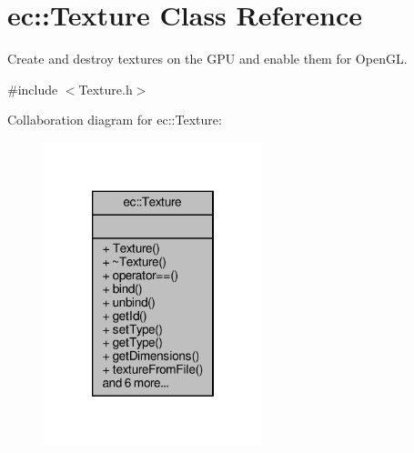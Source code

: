 \hypertarget{classec_1_1_texture}{}\section{ec\+:\+:Texture Class Reference}
\label{classec_1_1_texture}


Create and destroy textures on the G\+PU and enable them for Open\+GL.  




{\ttfamily \#include $<$Texture.\+h$>$}



Collaboration diagram for ec\+:\+:Texture\+:\nopagebreak
\begin{figure}[H]
\begin{center}
\leavevmode
\includegraphics[width=180pt]{classec_1_1_texture__coll__graph}
\end{center}
\end{figure}
